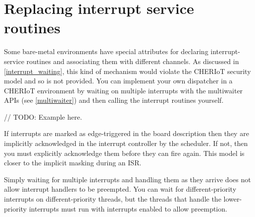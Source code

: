 \section{Replacing interrupt service routines}

Some bare-metal environments have special attributes for declaring interrupt-service routines and associating them with different channels.
As discussed in \ref{interrupt_waiting}, this kind of mechanism would violate the CHERIoT security model and so is not provided.
You can implement your own dispatcher in a CHERIoT environment by waiting on multiple interrupts with the multiwaiter APIs (see \ref{multiwaiter}) and then calling the interrupt routines yourself.

// TODO: Example here.

If interrupts are marked as edge-triggered in the board description then they are implicitly acknowledged in the interrupt controller by the scheduler.
If not, then you must explicitly acknowledge them before they can fire again.
This model is closer to the implicit masking during an ISR.

\begin{caution}
Simply waiting for multiple interrupts and handling them as they arrive does not allow interrupt handlers to be preempted.
You can wait for different-priority interrupts on different-priority threads, but the threads that handle the lower-priority interrupts must run with interrupts enabled to allow preemption.
\end{caution}
